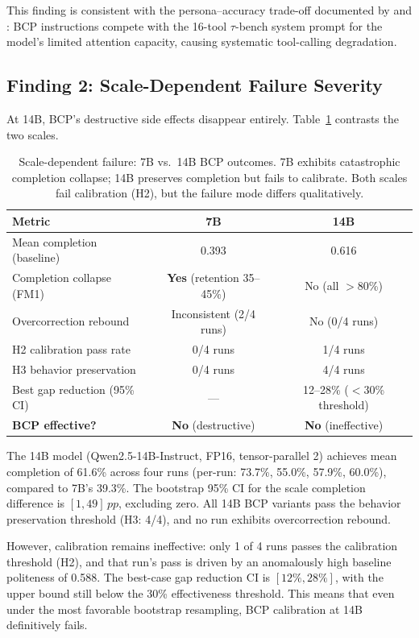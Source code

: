\documentclass[11pt,a4paper]{article}
\newcommand{\taubench}{$\tau$-bench}
\newcommand{\pp}{\,pp}
\begin{document}
This finding is consistent with the persona--accuracy trade-off documented by \citet{basil2025playing_pretend} and \citet{hu2026expert_persona}: BCP instructions compete with the 16-tool \taubench{} system prompt for the model's limited attention capacity, causing systematic tool-calling degradation.

\subsection{Finding 2: Scale-Dependent Failure Severity}
\label{sec:scale}

At 14B, BCP's destructive side effects disappear entirely.
Table~\ref{tab:scale_comparison} contrasts the two scales.

\begin{table}[t]
\centering
\caption{Scale-dependent failure: 7B vs.\ 14B BCP outcomes. 7B exhibits catastrophic completion collapse; 14B preserves completion but fails to calibrate. Both scales fail calibration (H2), but the failure mode differs qualitatively.}
\label{tab:scale_comparison}
\small
\begin{tabular}{@{}lcc@{}}
\toprule
Metric & 7B & 14B \\
\midrule
Mean completion (baseline) & 0.393 & 0.616 \\
Completion collapse (FM1) & \textbf{Yes} (retention 35--45\%) & No (all $>$80\%) \\
Overcorrection rebound & Inconsistent (2/4 runs) & No (0/4 runs) \\
H2 calibration pass rate & 0/4 runs & 1/4 runs \\
H3 behavior preservation & 0/4 runs & 4/4 runs \\
Best gap reduction (95\% CI) & --- & 12--28\% ($<$30\% threshold) \\
\midrule
\textbf{BCP effective?} & \textbf{No} (destructive) & \textbf{No} (ineffective) \\
\bottomrule
\end{tabular}
\end{table}

The 14B model (Qwen2.5-14B-Instruct, FP16, tensor-parallel 2) achieves mean completion of 61.6\% across four runs (per-run: 73.7\%, 55.0\%, 57.9\%, 60.0\%), compared to 7B's 39.3\%.
The bootstrap 95\% CI for the scale completion difference is $[1, 49]\pp$, excluding zero.
All 14B BCP variants pass the behavior preservation threshold (H3: 4/4), and no run exhibits overcorrection rebound.

However, calibration remains ineffective: only 1 of 4 runs passes the calibration threshold (H2), and that run's pass is driven by an anomalously high baseline politeness of 0.588.
The best-case gap reduction CI is $[12\%, 28\%]$, with the upper bound still below the 30\% effectiveness threshold.
This means that even under the most favorable bootstrap resampling, BCP calibration at 14B definitively fails.
\end{document}
